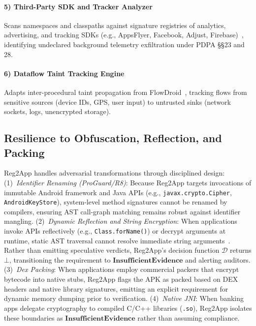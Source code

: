 \paragraph{5) Third-Party SDK and Tracker Analyzer} Scans namespaces and classpaths against signature registries of analytics, advertising, and tracking SDKs (e.g., AppsFlyer, Facebook, Adjust, Firebase)~\cite{leontiadis_sdk, binns_third_party_trackers}, identifying undeclared background telemetry exfiltration under PDPA §§23 and 28.

\paragraph{6) Dataflow Taint Tracking Engine} Adapts inter-procedural taint propagation from FlowDroid~\cite{flowdroid, amandroid, iccta}, tracking flows from sensitive sources (device IDs, GPS, user input) to untrusted sinks (network sockets, logs, unencrypted storage).

\subsection{Resilience to Obfuscation, Reflection, and Packing}
\label{sec:engine:obfuscation}

Reg2App handles adversarial transformations through disciplined design:
(1)~\textit{Identifier Renaming (ProGuard/R8)}: Because Reg2App targets invocations of immutable Android framework and Java APIs (e.g., \texttt{javax.crypto.Cipher}, \texttt{AndroidKeyStore}), system-level method signatures cannot be renamed by compilers, ensuring AST call-graph matching remains robust against identifier mangling.
(2)~\textit{Dynamic Reflection and String Encryption}: When applications invoke APIs reflectively (e.g., \texttt{Class.forName()}) or decrypt arguments at runtime, static AST traversal cannot resolve immediate string arguments~\cite{octeau_reflection, ernst_static_dynamic}. Rather than emitting speculative verdicts, Reg2App's decision function $\mathcal{D}$ returns $\bot$, transitioning the requirement to $\mathbf{InsufficientEvidence}$ and alerting auditors.
(3)~\textit{Dex Packing}: When applications employ commercial packers that encrypt bytecode into native stubs, Reg2App flags the APK as packed based on DEX headers and native library signatures, emitting an explicit requirement for dynamic memory dumping prior to verification.
(4)~\textit{Native JNI}: When banking apps delegate cryptography to compiled C/C++ libraries (\texttt{.so}), Reg2App isolates these boundaries as $\mathbf{InsufficientEvidence}$ rather than assuming compliance.

